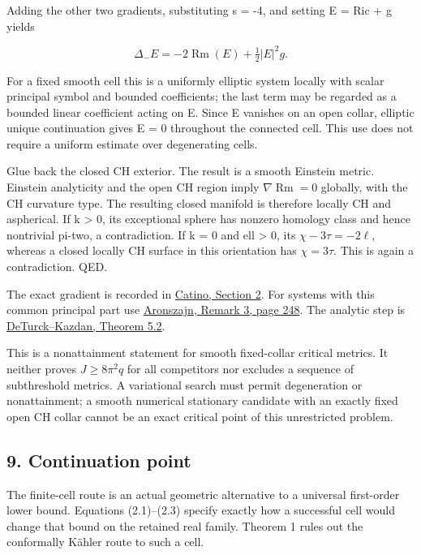 \documentclass[
  10pt,
]{article}
\begin{document}
Adding the other two gradients, substituting s = -4, and setting E = Ric
+ g yields

\[
       \Delta_-E=-2\operatorname{Rm}(E)+\tfrac12|E|^2g.     \tag{8.2}
\]

For a fixed smooth cell this is a uniformly elliptic system locally with
scalar principal symbol and bounded coefficients; the last term may be
regarded as a bounded linear coefficient acting on E. Since E vanishes
on an open collar, elliptic unique continuation gives E = 0 throughout
the connected cell. This use does not require a uniform estimate over
degenerating cells.

Glue back the closed CH exterior. The result is a smooth Einstein
metric. Einstein analyticity and the open CH region imply
\(\nabla\operatorname{Rm}=0\) globally, with the CH curvature type. The
resulting closed manifold is therefore locally CH and aspherical. If k
\textgreater{} 0, its exceptional sphere has nonzero homology class and
hence nontrivial pi-two, a contradiction. If k = 0 and ell
\textgreater{} 0, its \(\chi-3\tau=-2\ell\), whereas a closed locally CH
surface in this orientation has \(\chi=3\tau\). This is again a
contradiction. QED.

The exact gradient is recorded in
\href{https://arxiv.org/pdf/1404.0569}{Catino, Section 2}. For systems
with this common principal part use
\href{https://sites.math.washington.edu/~blwilson/Nodal/Aronszajn.pdf}{Aronszajn,
Remark 3, page 248}. The analytic step is
\href{https://www.numdam.org/article/ASENS_1981_4_14_3_249_0.pdf}{DeTurck--Kazdan,
Theorem 5.2}.

This is a nonattainment statement for smooth fixed-collar critical
metrics. It neither proves \(J\ge8\pi^2q\) for all competitors nor
excludes a sequence of subthreshold metrics. A variational search must
permit degeneration or nonattainment; a smooth numerical stationary
candidate with an exactly fixed open CH collar cannot be an exact
critical point of this unrestricted problem.

\hypertarget{continuation-point}{%
\subsection{9. Continuation point}\label{continuation-point}}

The finite-cell route is an actual geometric alternative to a universal
first-order lower bound. Equations (2.1)--(2.3) specify exactly how a
successful cell would change that bound on the retained real family.
Theorem 1 rules out the conformally Kähler route to such a cell.
\end{document}
